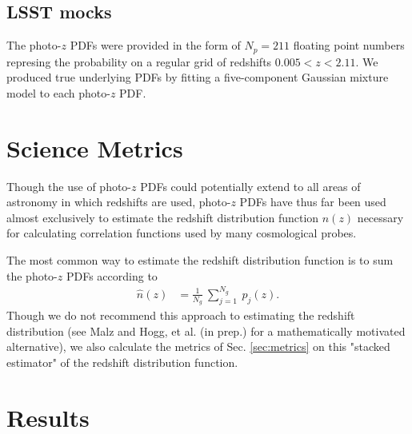 \documentclass[\docopts]{\docclass}
\begin{document}
\subsection{LSST mocks}
\label{sec:ss}


The photo-$z$ PDFs were provided in the form of $N_{p}=211$ floating point 
numbers represing the probability on a regular grid of redshifts $0.005 < z < 
2.11$.  We produced true underlying PDFs by fitting a five-component Gaussian 
mixture model to each photo-$z$ PDF.














\section{Science Metrics}
\label{sec:science}

Though the use of photo-$z$ PDFs could potentially extend to all areas of 
astronomy in which redshifts are used, photo-$z$ PDFs have thus far been used 
almost exclusively to estimate the redshift distribution function $n(z)$ 
necessary for calculating correlation functions used by many cosmological 
probes.


The most common way to estimate the redshift distribution function is to sum 
the photo-$z$ PDFs according to
\begin{align}
  \label{eq:nz}
  \hat{n}(z) &= \frac{1}{N_{g}}\ \sum_{j=1}^{N_{g}}\ p_{j}(z).
\end{align}
Though we do not recommend this approach to estimating the redshift 
distribution (see Malz and Hogg, et al. (in prep.) for a mathematically 
motivated alternative), we also calculate the metrics of Sec. \ref{sec:metrics} 
on this "stacked estimator" of the redshift distribution function.






\section{Results}
\label{sec:results}


\end{document}
